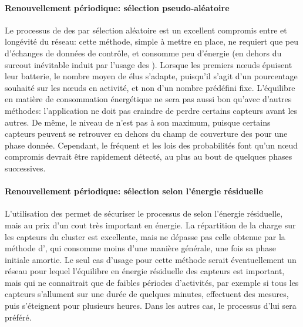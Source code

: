 \paragraph{Renouvellement périodique: sélection pseudo-aléatoire}
Le processus de  des \cns par sélection aléatoire est un excellent compromis entre \secu et longévité du réseau: cette méthode, simple à mettre en place, ne requiert que peu d'échanges de données de contrôle, et consomme peu d'énergie (en dehors du surcout inévitable induit par l'usage des \cns).
Lorsque les premiers nœuds épuisent leur batterie, le nombre moyen de \cns élus s'adapte, puisqu'il s'agit d'un pourcentage souhaité sur les nœuds en activité, et non d'un nombre prédéfini fixe.
L'équilibre en matière de consommation énergétique ne sera pas aussi bon qu'avec d'autres méthodes: l'application ne doit pas craindre de perdre certains capteurs avant les autres.
De même, le niveau de \secu n'est pas à son maximum, puisque certains capteurs peuvent se retrouver en dehors du champ de couverture des \cns pour une phase donnée.
Cependant, le  fréquent et les lois des probabilités font qu'un nœud compromis devrait être rapidement détecté, au plus au bout de quelques phases successives.

\paragraph{Renouvellement périodique: sélection selon l'énergie résiduelle}
L'utilisation des \vns permet de sécuriser le processus de  selon l'énergie résiduelle, mais au prix d'un cout très important en énergie.
La répartition de la charge sur les capteurs du cluster est excellente, mais ne dépasse pas celle obtenue par la méthode d'\elecdem, qui consomme moins d'une manière générale, une fois sa phase initiale amortie.
Le seul cas d'usage pour cette méthode serait éventuellement un réseau pour lequel l'équilibre en énergie résiduelle des capteurs est important, mais qui ne connaitrait que de faibles périodes d'activités, par exemple si tous les capteurs s'allument sur une durée de quelques minutes, effectuent des mesures, puis s'éteignent pour plusieurs heures.
Dans les autres cas, le processus d'\elecdem lui sera préféré.

